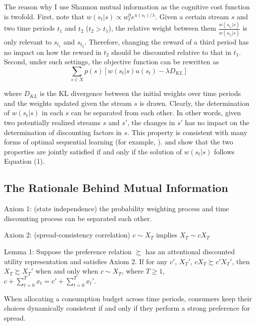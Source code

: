 \documentclass[
  12pt,
]{article}
\begin{document}
The reason why I use Shannon mutual information as the cognitive cost
function is twofold. First, note that
\(w(s_t|s) \propto w^0_t e^{u(s_t)/\lambda}\). Given a certain stream
\(s\) and two time periods \(t_1\) and \(t_2\) (\(t_2>t_1\)), the
relative weight between them \(\frac{w(s_{t_1}|s)}{w(s_{t_2}|s)}\) is
only relevant to \(s_{t_1}\) and \(s_{t_2}\). Therefore, changing the
reward of a third period has no impact on how the reward in \(t_2\)
should be discounted relative to that in \(t_1\). Second, under such
settings, the objective function can be rewritten as\[
\sum_{s\in X} p(s)[w(s_t|s)u(s_t) - \lambda D_{KL}]
\]

where \(D_{KL}\) is the KL divergence between the initial weights over
time periods and the weights updated given the stream \(s\) is drawn.
Clearly, the determination of \(w(s_t|s)\) in each \(s\) can be
separated from each other. In other words, given two potentially
realized streams \(s\) and \(s'\), the changes in \(s'\) has no impact
on the determination of discounting factors in \(s\). This property is
consistent with many forms of optimal sequential learning (for example,
\citet{zhong_optimal_2022} ). \citet{matejka_rational_2015} and
\citet{caplin_rationally_2022} show that the two properties are jointly
satisfied if and only if the solution of \(w(s_t|s)\) follows Equation
(1).

\hypertarget{the-rationale-behind-mutual-information}{%
\subsection{The Rationale Behind Mutual
Information}\label{the-rationale-behind-mutual-information}}

Axiom 1: (state independence) the probability weighting process and time
discounting process can be separated each other.

Axiom 2: (spread-consistency correlation) \(c\sim X_T\) implies
\(X_T \sim cX_T\)

Lemma 1: Suppose the preference relation \(\succsim\) has an attentional
discounted utility representation and satisfies Axiom 2. If for any
\(c'\), \(X_T'\), \(cX_T\succsim c'X_T'\), then \(X_T \succsim X_T'\)
when and only when \(c\sim X_T\), where \(T\geq 1\),
\(c+\sum_{t=0}^Tx_t=c'+\sum_{t=0}^Tx_t'\).

When allocating a consumption budget across time periods, consumers keep
their choices dynamically consistent if and only if they perform a
strong preference for spread.
\end{document}
